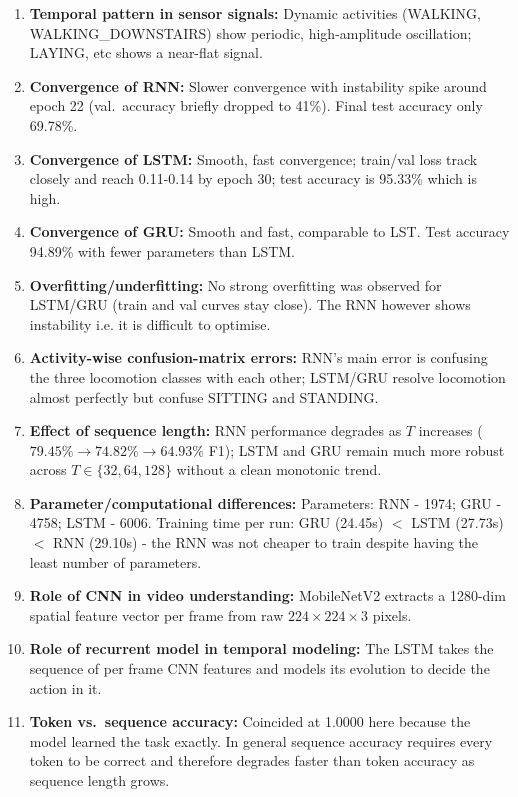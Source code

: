 \documentclass[10pt]{article}
\begin{document}
\begin{enumerate}
\item \textbf{Temporal pattern in sensor signals:} Dynamic activities
(WALKING, WALKING\_DOWNSTAIRS) show periodic, high-amplitude oscillation;
LAYING, etc shows a near-flat signal.
\item \textbf{Convergence of RNN:} Slower convergence with instability spike around epoch 22 (val.\ accuracy briefly dropped to 41\%).
Final test accuracy only 69.78\%.
\item \textbf{Convergence of LSTM:} Smooth, fast convergence; train/val loss
track closely and reach 0.11-0.14 by epoch 30; test accuracy is 
95.33\% which is high.
\item \textbf{Convergence of GRU:} Smooth and fast, comparable to
LST. Test accuracy 94.89\% with fewer parameters than LSTM.
\item \textbf{Overfitting/underfitting:} No strong overfitting was observed
for LSTM/GRU (train and val curves stay close). The RNN however shows instability i.e. it is difficult to optimise.
\item \textbf{Activity-wise confusion-matrix errors:} RNN's main error is
confusing the three locomotion classes with each other; LSTM/GRU resolve
locomotion almost perfectly but confuse SITTING and STANDING.
\item \textbf{Effect of sequence length:} RNN performance degrades as $T$ increases ($79.45\%\to74.82\%\to64.93\%$ F1); LSTM and
GRU remain much more robust across $T\in\{32,64,128\}$ without a clean
monotonic trend.
\item \textbf{Parameter/computational differences:} Parameters:
RNN - 1974; GRU - 4758; LSTM - 6006. Training time per run: GRU
(24.45s) $<$ LSTM (27.73s) $<$ RNN (29.10s) - the RNN was not cheaper to
train despite having the least number of parameters.
\item \textbf{Role of CNN in video understanding:} MobileNetV2
extracts a 1280-dim spatial feature vector per frame from raw
$224\times224\times3$ pixels.
\item \textbf{Role of recurrent model in temporal modeling:} The LSTM
takes the sequence of per frame CNN features and models its evolution to decide the action in it.
\item \textbf{Token vs.\ sequence accuracy:} Coincided at 1.0000 here
because the model learned the task exactly. In general sequence accuracy requires every token to be correct and therefore degrades faster than token accuracy as sequence length grows.
\end{enumerate}
\end{document}
